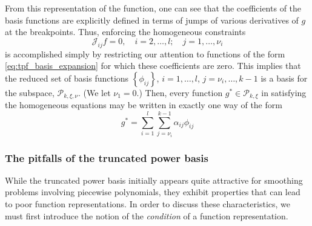 \documentclass[12pt]{article}
\newcommand{\PP}{\mathcal{P}}
\theoremstyle{definition}
\begin{document}
From this representation of the function, one can see that the coefficients of the basis functions are explicitly defined in terms of jumps of various derivatives of $g$ at the breakpoints. Thus, enforcing the homogeneous constraints 
\[
\mathscr{J}_{ij}f = 0, \quad i=2,\dots, l;\quad j=1,\dots,\nu_i
\]
is accomplished simply by restricting our attention to functions of the form \ref{eq:tpf_basis_expansion} for which these coefficients are zero. This implies that the reduced set of basis functions $\left\{ \phi_{ij} \right\}$, $i=1,\dots,l$, $j=\nu_{i},\dots,k-1$ is a basis for the subspace, $\PP_{k,\xi,\nu}$. (We let $\nu_1 =0$.) Then, every function $g^* \in \PP_{k,\xi}$ in satisfying the homogeneous equations may be written in exactly one way of the form
\begin{equation} \label{eq:tpf_subspace_basis_expansion}
g^* = \sum_{i=1}^l \sum_{j={\nu_i}}^{k-1} \alpha_{ij} \phi_{ij}
\end{equation}

\subsubsection{The pitfalls of the truncated power basis}

While the truncated power basis initially appears quite attractive for smoothing problems involving piecewise polynomials, they exhibit properties that can lead to poor function representations. In order to discuss these characteristics, we must first introduce the notion of the \emph{condition} of a function representation.
\end{document}
